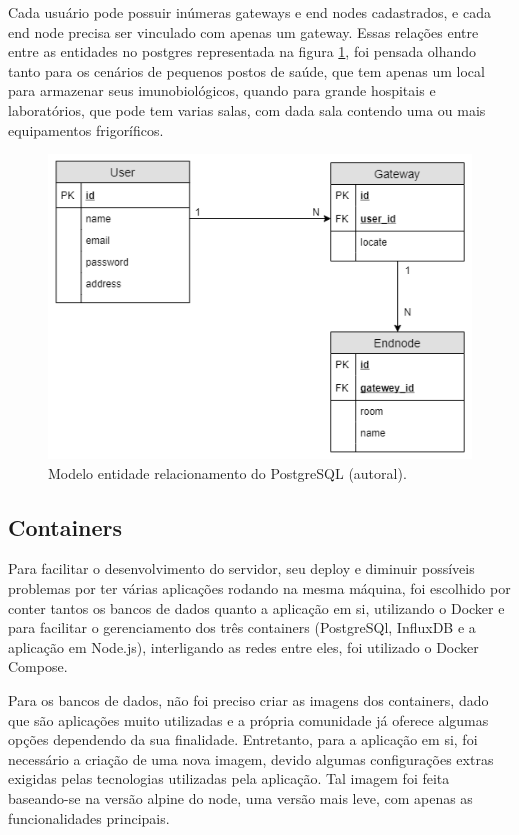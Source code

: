 Cada usuário pode possuir inúmeras gateways e end nodes cadastrados, e cada end node precisa ser vinculado com apenas um gateway. Essas relações entre entre as entidades no postgres representada na figura \ref{fig:postgres-model}, foi pensada olhando tanto para os cenários de pequenos postos de saúde, que tem apenas um local para armazenar seus imunobiológicos, quando para grande hospitais e laboratórios, que pode tem varias salas, com dada sala contendo uma ou mais equipamentos frigoríficos.

\begin{figure}[H]
  \centering
  \includegraphics[width=.80\textwidth]{assets/postgres-model.png} 
  \caption{Modelo entidade relacionamento do PostgreSQL (autoral).}
  \label{fig:postgres-model} 
\end{figure}

\subsection{Containers}
\label{metod:servidor:containers}
Para facilitar o desenvolvimento do servidor, seu deploy e diminuir possíveis problemas por ter várias aplicações rodando na mesma máquina, foi escolhido por conter tantos os bancos de dados quanto a aplicação em si, utilizando o Docker e para facilitar o gerenciamento dos três containers (PostgreSQl, InfluxDB e a aplicação em Node.js), interligando as redes entre eles, foi utilizado o Docker Compose.

Para os bancos de dados, não foi preciso criar as imagens dos containers, dado que são aplicações muito utilizadas e a própria comunidade já oferece algumas opções dependendo da sua finalidade. Entretanto, para a aplicação em si, foi necessário a criação de uma nova imagem, devido algumas configurações extras exigidas pelas tecnologias utilizadas pela aplicação. Tal imagem foi feita baseando-se na versão alpine do node, uma versão mais leve, com apenas as funcionalidades principais.

